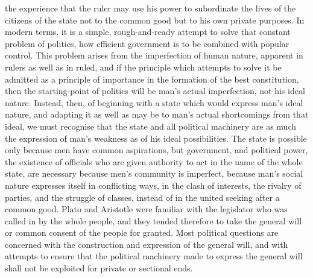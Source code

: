 the experience that the ruler may use his power to subordinate the lives
of the citizens of the state not to the common good but to his own private
purposes. In modern terms, it is a simple, rough-and-ready attempt to
solve that constant problem of politics, how efficient government is to be
combined with popular control. This problem arises from the imperfection
of human nature, apparent in rulers as well as in ruled, and if the
principle which attempts to solve it be admitted as a principle of
importance in the formation of the best constitution, then the
starting-point of politics will be man's actual imperfection, not his
ideal nature. Instead, then, of beginning with a state which would express
man's ideal nature, and adapting it as well as may be to man's actual
shortcomings from that ideal, we must recognise that the state and all
political machinery are as much the expression of man's weakness as of his
ideal possibilities. The state is possible only because men have common
aspirations, but government, and political power, the existence of
officials who are given authority to act in the name of the whole state,
are necessary because men's community is imperfect, because man's social
nature expresses itself in conflicting ways, in the clash of interests,
the rivalry of parties, and the struggle of classes, instead of in the
united seeking after a common good. Plato and Aristotle were familiar with
the legislator who was called in by the whole people, and they tended
therefore to take the general will or common consent of the people for
granted. Most political questions are concerned with the construction and
expression of the general will, and with attempts to ensure that the
political machinery made to express the general will shall not be
exploited for private or sectional ends.

